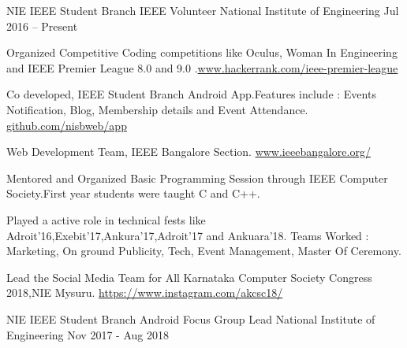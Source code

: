 \begin{cventries}
  \cventry
    {NIE IEEE Student Branch} %
    {IEEE Volunteer} %
    {National Institute of Engineering} %
    {Jul 2016 – Present} %
    {
      \begin{cvitems} %
        \item {Organized Competitive Coding competitions like Oculus, Woman In Engineering and IEEE Premier League 8.0 and 9.0 .\href{https://www.hackerrank.com/ieee-premier-league}{www.hackerrank.com/ieee-premier-league}}
        \item { Co developed, IEEE Student Branch Android App.Features include : Events Notification, Blog, Membership details and Event Attendance.
\href{http://github.com/nisbweb/app}{github.com/nisbweb/app}}
        \item {Web Development Team, IEEE Bangalore Section.
\href{www.ieeebangalore.org/}{www.ieeebangalore.org/}}
    \item {Mentored and Organized Basic Programming Session through IEEE Computer Society.First year students were taught C and C++.}
    \item {Played a active role in technical fests like Adroit'16,Exebit'17,Ankura'17,Adroit'17 and Ankuara'18.
Teams Worked : Marketing, On ground Publicity, Tech, Event Management, Master Of Ceremony.}
    \item {Lead the Social Media Team for All Karnataka Computer Society Congress 2018,NIE Mysuru.
\newline{}\href{https://www.instagram.com/akcsc18/}{https://www.instagram.com/akcsc18/} }
      \end{cvitems}
    }

  \cventry
    {NIE IEEE Student Branch} %
    {Android Focus Group Lead} %
    {National Institute of Engineering} %
    {Nov 2017 - Aug 2018} %
    {}


\end{cventries}
